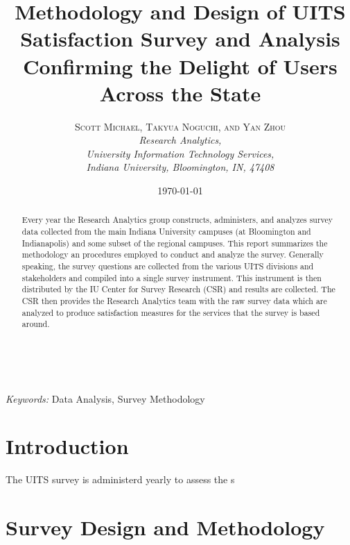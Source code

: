 \documentclass[12pt]{article} %
\title{\textbf{Methodology and Design of UITS Satisfaction Survey and Analysis}\\ %
Confirming the Delight of Users Across the State} %
\author{\textsc{Scott Michael, Takyua Noguchi, and Yan Zhou} %
\\{\textit{Research Analytics,\\
                University Information Technology Services,\\ 
                Indiana University, Bloomington, IN, 47408}}} %
\date{\today} %
\makeatletter
\renewcommand{\maketitle}{ %
\begin{flushright} %
{\LARGE\@title} %

\vspace{50pt} %

{\large\@author} %
\\\@date %

\vspace{40pt} %
\end{flushright}
}
\makeatother
\begin{document}
\maketitle %



\begin{abstract}
Every year the Research Analytics group constructs, administers, and analyzes survey data collected from the
main Indiana University campuses (at Bloomington and Indianapolis) and some subset of the regional
campuses. This report summarizes the methodology an procedures employed to conduct and analyze the
survey. Generally speaking, the survey questions are collected from the various UITS divisions and
stakeholders and compiled into a single survey instrument. This instrument is then distributed by the IU
Center for Survey Research (CSR) and results are collected. The CSR then provides the Research Analytics team
with the raw survey data which are analyzed to produce satisfaction measures for the services that the survey
is based around.
\end{abstract}

\hspace*{3,6mm}\textit{Keywords:} Data Analysis, Survey Methodology %

\vspace{30pt} %


\section*{Introduction}
The UITS survey is administerd yearly to assess the s



\section*{Survey Design and Methodology}
\end{document}
